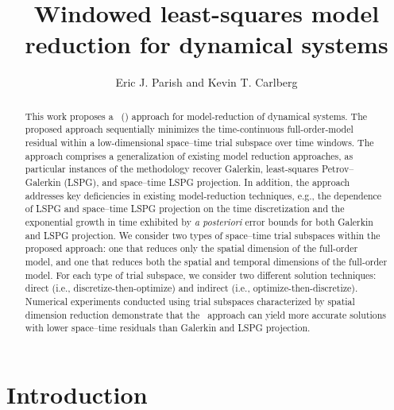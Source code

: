 \documentclass[3p,computermodern,10pt]{elsarticle}
\begin{document}
\begin{frontmatter}

\title{Windowed least-squares model reduction for dynamical systems}

\author[a]{Eric J. Parish and Kevin T. Carlberg}

\address[a]{Sandia National Laboratories,  Livermore, CA}
\begin{abstract}
This work proposes a \methodNameLower\ (\methodAcronym) approach for model-reduction
	of dynamical systems. The proposed approach sequentially minimizes the
	time-continuous full-order-model residual within a low-dimensional space--time trial
	subspace over time windows. The approach comprises a generalization 
of existing model reduction approaches, as particular instances of
  the methodology recover Galerkin,
	least-squares Petrov--Galerkin (LSPG), and space–time LSPG projection. In
	addition, the approach
	addresses key deficiencies in existing model-reduction
	techniques, e.g., the dependence of LSPG and space--time LSPG projection on the
	time discretization and the exponential growth in time exhibited by \textit{a posteriori}
	error bounds for both Galerkin and LSPG projection.  We consider two types of
	space--time trial
	subspaces within the proposed approach: one that reduces only the spatial dimension of the full-order model, and one that reduces both the spatial and temporal dimensions of the full-order model. For each type of trial
	subspace, we consider two different solution techniques: direct (i.e.,
	discretize-then-optimize) and indirect (i.e., optimize-then-discretize).
	Numerical experiments conducted using trial subspaces characterized by spatial
	dimension reduction demonstrate that the \methodAcronym\
	approach can yield more accurate solutions with lower space--time residuals than
	Galerkin and LSPG projection. 

\end{abstract}
\end{frontmatter}


\section{Introduction}
\end{document}
